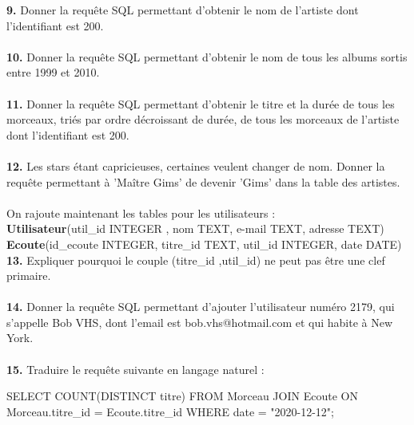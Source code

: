 \documentclass[a4paper,10pt,french]{book}
\begin{document}
    \textbf{9.} Donner la requête SQL permettant d’obtenir le nom de l’artiste dont l’identifiant est 200.\\
    
\\

    \textbf{10.}	Donner la requête SQL permettant d’obtenir le nom de tous les albums sortis entre 1999 et 2010.\\

\\

    \textbf{11.}	Donner la requête SQL permettant d’obtenir le titre et la durée de tous les morceaux, triés par ordre décroissant de durée, de tous les morceaux de l’artiste dont l’identifiant est 200.\\
    
\\

    \textbf{12.}	Les stars étant capricieuses, certaines veulent changer de nom. Donner la requête permettant à 'Maître Gims' de devenir 'Gims' dans la table des artistes.\\
    
\\
    
    
    On rajoute maintenant les tables pour les utilisateurs :\\
    
    \textbf{Utilisateur}(util\_id INTEGER , nom TEXT, e-mail TEXT, adresse TEXT)\\
    \textbf{Ecoute}(id\_ecoute INTEGER, titre\_id TEXT, util\_id INTEGER, date DATE)\\
    
    \textbf{13.}	Expliquer pourquoi le couple (titre\_id ,util\_id) ne peut pas être une clef primaire.\\
    
\\

    \textbf{14.}	Donner la requête SQL permettant d’ajouter l’utilisateur numéro 2179, qui s’appelle Bob
    VHS, dont l’email est bob.vhs@hotmail.com et qui habite à New York.\\
    
\\

    \textbf{15.}	Traduire le requête suivante en langage naturel :
    \begin{sql}
        SELECT COUNT(DISTINCT titre) FROM Morceau
        JOIN Ecoute ON Morceau.titre_id = Ecoute.titre_id 
        WHERE date = "2020-12-12";
  
    \end{sql}  
    
\end{document}
